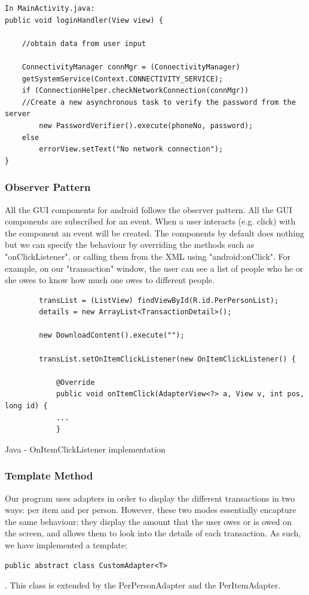 \documentclass[a4paper,11pt]{article}
\begin{document}
 \begin{verbatim}
In MainActivity.java:
public void loginHandler(View view) {

	//obtain data from user input

	ConnectivityManager connMgr = (ConnectivityManager) 
	getSystemService(Context.CONNECTIVITY_SERVICE);
	if (ConnectionHelper.checkNetworkConnection(connMgr))
	//Create a new asynchronous task to verify the password from the server
		new PasswordVerifier().execute(phoneNo, password);
	else
		errorView.setText("No network connection");
}
 \end{verbatim}
 
\subsubsection*{Observer Pattern}

All the GUI components for android follows the observer pattern. All the GUI components are subscribed for an event. When a user interacts (e.g. click) with the component an event will be created. The components by default does nothing but we can specify the behaviour by overriding the methods such as "onClickListener", or calling them from the XML using "android:onClick". For example, on our "transaction" window, the user can see a list of people who he or she owes to know how much one owes to different people.  

\begin{center}
\begin{verbatim}
		transList = (ListView) findViewById(R.id.PerPersonList);
		details = new ArrayList<TransactionDetail>();

		new DownloadContent().execute("");
		
		transList.setOnItemClickListener(new OnItemClickListener() {

			@Override
			public void onItemClick(AdapterView<?> a, View v, int pos, long id) {
			...
			}
\end{verbatim}
Java - OnItemClickListener implementation
\end{center}
 
\subsubsection*{Template Method}
Our program uses adapters in order to display the different transactions in two ways: per item and per person. However, these two modes essentially encapture the same behaviour: they display the amount that the user owes or is owed on the screen, and allows them to look into the details of each transaction. As such, we have implemented a template: 
\begin{verbatim}
public abstract class CustomAdapter<T> 
\end{verbatim}.
This class is extended by the PerPersonAdapter and the PerItemAdapter.
\end{document}
